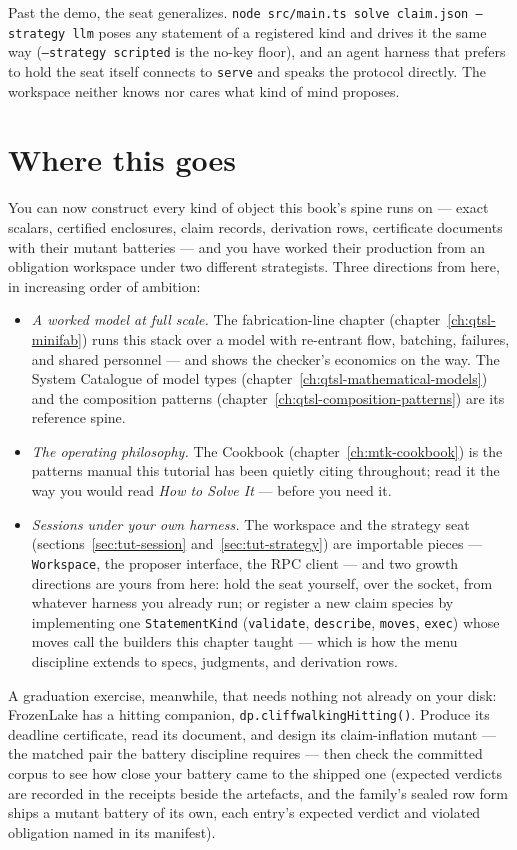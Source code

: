 Past the demo, the seat generalizes.
\texttt{node src/main.ts solve claim.json --strategy llm} poses any
statement of a registered kind and drives it the same way
(\texttt{--strategy scripted} is the no-key floor), and an agent
harness that prefers to hold the seat itself connects to
\texttt{serve} and speaks the protocol directly. The workspace
neither knows nor cares what kind of mind proposes.

\section{Where this goes}
\label{sec:tut-next}

You can now construct every kind of object this book's spine runs
on --- exact scalars, certified enclosures, claim records,
derivation rows, certificate documents with their mutant batteries
--- and you have worked their production from an obligation
workspace under two different strategists. Three directions from
here, in increasing order of ambition:

\begin{itemize}
\item \emph{A worked model at full scale.} The fabrication-line
  chapter (chapter~\ref{ch:qtsl-minifab}) runs this stack over a
  model with re-entrant flow, batching, failures, and shared
  personnel --- and shows the checker's economics on the way. The
  System Catalogue of model types (chapter~\ref{ch:qtsl-mathematical-models})
  and the composition patterns
  (chapter~\ref{ch:qtsl-composition-patterns}) are its reference
  spine.
\item \emph{The operating philosophy.} The Cookbook
  (chapter~\ref{ch:mtk-cookbook}) is the patterns manual this
  tutorial has been quietly citing throughout; read it the way you
  would read \emph{How to Solve It} \cite{polya1945solve} --- before
  you need it.
\item \emph{Sessions under your own harness.} The workspace and the
  strategy seat (sections~\ref{sec:tut-session}
  and~\ref{sec:tut-strategy}) are importable pieces ---
  \texttt{Workspace}, the proposer interface, the RPC client --- and
  two growth directions are yours from here: hold the seat yourself,
  over the socket, from whatever harness you already run; or
  register a new claim species by implementing one
  \texttt{StatementKind} (\texttt{validate}, \texttt{describe},
  \texttt{moves}, \texttt{exec}) whose moves call the builders this
  chapter taught --- which is how the menu discipline extends to
  specs, judgments, and derivation rows.
\end{itemize}

\noindent A graduation exercise, meanwhile, that needs nothing not
already on your disk: FrozenLake has a hitting companion,
\texttt{dp.cliffwalkingHitting()}. Produce its deadline certificate,
read its document, and design its claim-inflation mutant --- the
matched pair the battery discipline requires --- then check the
committed corpus to see how close your battery came to the shipped
one (expected verdicts are recorded in the receipts beside the
artefacts, and the family's sealed row form ships a mutant battery
of its own, each entry's expected verdict and violated obligation
named in its manifest).

